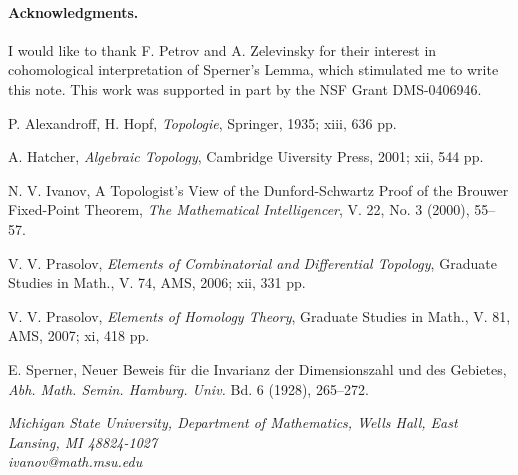 \documentclass[leqno, 11pt]{article}\usepackage{latexsym}\usepackage{amsmath, amscd}\usepackage{amssymb}
\begin{document}
\paragraph{Acknowledgments.} I would like to thank F. Petrov and A. Zelevinsky for their interest in cohomological interpretation of Sperner's Lemma, 
which stimulated me to write this note.
This work was supported in part by the NSF Grant DMS-0406946.


\begin{thebibliography}{XXX}



 P. Alexandroff, H. Hopf, {\em Topologie}, Springer, 1935; xiii, 636 pp. 

 A. Hatcher, {\em Algebraic Topology}, Cambridge Uiversity Press, 2001; xii, 544 pp.

 N. V. Ivanov, A Topologist's View of the Dunford-Schwartz Proof of the Brouwer Fixed-Point Theorem, {\em The Mathematical Intelligencer}, V. 22, No. 3 (2000), 55--57.

 V. V. Prasolov, {\em  Elements of Combinatorial and Differential Topology}, Graduate Studies in Math., V. 74, AMS, 2006; xii, 331 pp.

 V. V. Prasolov, {\em Elements of Homology Theory}, Graduate Studies in Math., V. 81, AMS, 2007; xi, 418 pp.

 E. Sperner, Neuer Beweis f\"ur die Invarianz der Dimensionszahl und des Gebietes, {\em Abh. Math. Semin. Hamburg. Univ.\/} Bd. 6 (1928), 265--272. 


\end{thebibliography}


\noindent
{\it Michigan State University, Department of Mathematics, Wells Hall,
East Lansing, MI 48824-1027\\

\noindent
ivanov@math.msu.edu}
\end{document}
